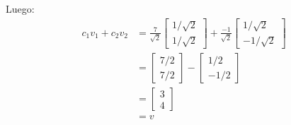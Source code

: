 \documentclass[11pt,letterpaper]{article}
\begin{document}
Luego:
\begin{align*}
    c_1 v_1 + c_2 v_2 &= \frac{7}{\sqrt{2}}\begin{bmatrix} 1/\sqrt{2}\\1/\sqrt{2} \end{bmatrix} + \frac{-1}{\sqrt{2}}\begin{bmatrix} 1/\sqrt{2}\\-1/\sqrt{2} \end{bmatrix} \\
    &=\begin{bmatrix} 7/2\\7/2 \end{bmatrix} - \begin{bmatrix} 1/2\\-1/2 \end{bmatrix} \\
    &=\begin{bmatrix} 3\\4 \end{bmatrix} \\
    &=v
\end{align*}\,\\
\end{document}
